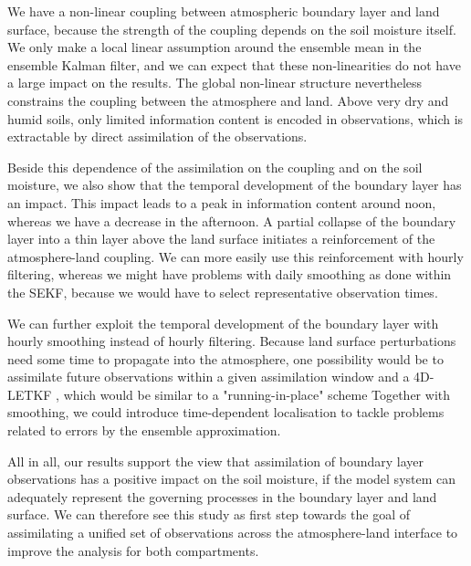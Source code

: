 \documentclass[hess, manuscript]{copernicus}
\begin{document}
We have a non-linear coupling between atmospheric boundary layer and land surface, because the strength of the coupling depends on the soil moisture itself.
We only make a local linear assumption around the ensemble mean in the ensemble Kalman filter, and we can expect that these non-linearities do not have a large impact on the results.
The global non-linear structure nevertheless constrains the coupling between the atmosphere and land.
Above very dry and humid soils, only limited information content is encoded in observations, which is extractable by direct assimilation of the observations.

Beside this dependence of the assimilation on the coupling and on the soil moisture, we also show that the temporal development of the boundary layer has an impact.
This impact leads to a peak in information content around noon, whereas we have a decrease in the afternoon.
A partial collapse of the boundary layer into a thin layer above the land surface initiates a reinforcement of the atmosphere-land coupling.
We can more easily use this reinforcement with hourly filtering, whereas we might have problems with daily smoothing as done within the SEKF, because we would have to select representative observation times.

We can further exploit the temporal development of the boundary layer with hourly smoothing instead of hourly filtering.
Because land surface perturbations need some time to propagate into the atmosphere, one possibility would be to assimilate future observations within a given assimilation window and a 4D-LETKF \citep{harlim_four-dimensional_2007,kalnay_response_2007}, which would be similar to a "running-in-place" scheme \citep{kalnay_accelerating_2010}
Together with smoothing, we could introduce time-dependent localisation to tackle problems related to errors by the ensemble approximation.

All in all, our results support the view that assimilation of boundary layer observations has a positive impact on the soil moisture, if the model system can adequately represent the governing processes in the boundary layer and land surface.
We can therefore see this study as first step towards the goal of assimilating a unified set of observations across the atmosphere-land interface to improve the analysis for both compartments.
\end{document}
